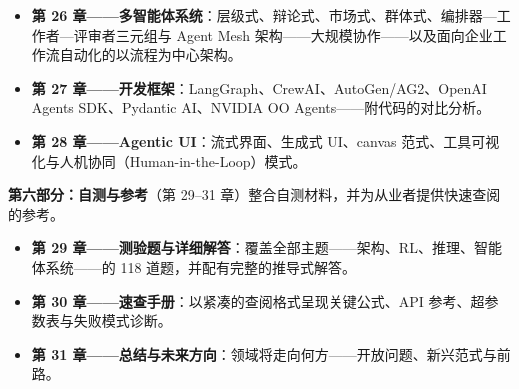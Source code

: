 \documentclass[11pt,a4paper,openany]{book}
\begin{document}
\begin{itemize}
  \item \textbf{第 26 章——多智能体系统}：层级式、辩论式、市场式、群体式、编排器—工作者—评审者三元组与 Agent Mesh 架构——大规模协作——以及面向企业工作流自动化的以流程为中心架构。
  \item \textbf{第 27 章——开发框架}：LangGraph、CrewAI、AutoGen/AG2、OpenAI Agents SDK、Pydantic AI、NVIDIA OO Agents——附代码的对比分析。
  \item \textbf{第 28 章——Agentic UI}：流式界面、生成式 UI、canvas 范式、工具可视化与人机协同（Human-in-the-Loop）模式。
\end{itemize}

\textbf{第六部分：自测与参考}（第 29--31 章）整合自测材料，并为从业者提供快速查阅的参考。

\begin{itemize}
  \item \textbf{第 29 章——测验题与详细解答}：覆盖全部主题——架构、RL、推理、智能体系统——的 118 道题，并配有完整的推导式解答。
  \item \textbf{第 30 章——速查手册}：以紧凑的查阅格式呈现关键公式、API 参考、超参数表与失败模式诊断。
  \item \textbf{第 31 章——总结与未来方向}：领域将走向何方——开放问题、新兴范式与前路。
\end{itemize}
\end{document}
